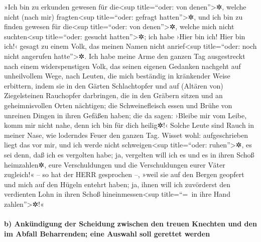 »Ich bin zu erkunden gewesen für die\textless sup
title=``oder: von denen''\textgreater✲, welche nicht (nach mir)
fragten\textless sup title=``oder: gefragt hatten''\textgreater✲, und
ich bin zu finden gewesen für die\textless sup title=``oder: von
denen''\textgreater✲, welche mich nicht suchten\textless sup
title=``oder: gesucht hatten''\textgreater✲; ich habe ›Hier bin ich!
Hier bin ich!‹ gesagt zu einem Volk, das meinen Namen nicht
anrief\textless sup title=``oder: noch nicht angerufen
hatte''\textgreater✲. Ich habe meine Arme den ganzen Tag
ausgestreckt nach einem widerspenstigen Volk, das seinen eigenen
Gedanken nachgeht auf unheilvollem Wege, nach Leuten, die
mich beständig in kränkender Weise erbittern, indem sie in den Gärten
Schlachtopfer und auf (Altären von) Ziegelsteinen Rauchopfer darbringen,
die in den Gräbern sitzen und an geheimnisvollen Orten
nächtigen; die Schweinefleisch essen und Brühe von unreinen Dingen in
ihren Gefäßen haben; die da sagen: ›Bleibe mir vom Leibe,
komm mir nicht nahe, denn ich bin für dich heilig✲!‹ Solche Leute sind
Rauch in meiner Nase, wie loderndes Feuer den ganzen Tag.
Wisset wohl: aufgeschrieben liegt das vor mir, und ich
werde nicht schweigen\textless sup title=``oder: ruhen''\textgreater✲,
es sei denn, daß ich es vergolten habe; ja, vergelten will ich es und es
in ihren Schoß heimzahlen✲, eure Verschuldungen und die
Verschuldungen eurer Väter zugleich!« -- so hat der HERR gesprochen --,
»weil sie auf den Bergen geopfert und mich auf den Hügeln entehrt haben;
ja, ihnen will ich zuvörderst den verdienten Lohn in ihren Schoß
hineinmessen\textless sup title=``=~in ihre Hand zahlen''\textgreater✲!«

\hypertarget{b-ankuxfcndigung-der-scheidung-zwischen-den-treuen-knechten-und-den-im-abfall-beharrenden-eine-auswahl-soll-gerettet-werden}{%
\paragraph{b) Ankündigung der Scheidung zwischen den treuen Knechten und
den im Abfall Beharrenden; eine Auswahl soll gerettet
werden}\label{b-ankuxfcndigung-der-scheidung-zwischen-den-treuen-knechten-und-den-im-abfall-beharrenden-eine-auswahl-soll-gerettet-werden}}

